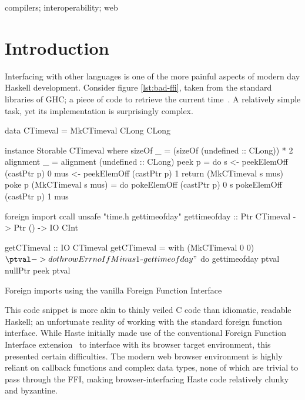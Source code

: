 \documentclass[preprint]{sigplanconf}
\begin{document}

%
\keywords
compilers; interoperability; web

\section{Introduction}\label{sec:intro}
Interfacing with other languages is one of the more painful aspects of modern
day Haskell development. Consider figure \ref{lst:bad-ffi}, taken from the
standard libraries of GHC; a piece of code to retrieve the
current time\ \cite{time}. A relatively simple task, yet its implementation is
surprisingly complex.

\begin{listingfloat}
\begin{code}
data CTimeval = MkCTimeval CLong CLong

instance Storable CTimeval where
	sizeOf _ = (sizeOf (undefined :: CLong)) * 2
	alignment _ = alignment (undefined :: CLong)
	peek p = do
		s   <- peekElemOff (castPtr p) 0
		mus <- peekElemOff (castPtr p) 1
		return (MkCTimeval s mus)
	poke p (MkCTimeval s mus) = do
		pokeElemOff (castPtr p) 0 s
		pokeElemOff (castPtr p) 1 mus

foreign import ccall unsafe "time.h gettimeofday"
   gettimeofday :: Ptr CTimeval -> Ptr () -> IO CInt

getCTimeval :: IO CTimeval
getCTimeval = with (MkCTimeval 0 0) $ \ptval -> do
  throwErrnoIfMinus1_ "gettimeofday" $ do
    gettimeofday ptval nullPtr
  peek ptval
\end{code}
\caption{Foreign imports using the vanilla Foreign Function Interface}
\label{lst:bad-ffi}
\end{listingfloat}

This code snippet is more akin to thinly veiled C code than idiomatic, readable
Haskell; an unfortunate reality of working with the standard foreign function
interface.
While Haste initially made use of the conventional Foreign Function Interface
extension\ \cite{ffi} to interface with its browser target environment,
this presented certain difficulties.
The modern web browser environment is highly reliant on callback functions and
complex data types, none of which are trivial to pass through the FFI,
making browser-interfacing Haste code relatively clunky and byzantine.
\end{document}
